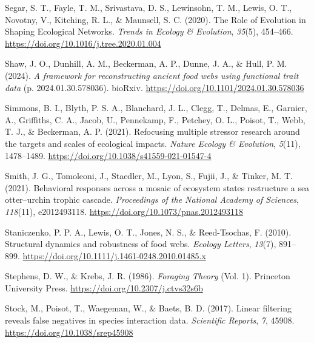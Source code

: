 \documentclass[
]{article}
\newlength{\cslhangindent}
\newenvironment{CSLReferences}[2] %
 {\begin{list}{}{%
  \setlength{\itemindent}{0pt}
  \setlength{\leftmargin}{0pt}
  \setlength{\parsep}{0pt}
  \ifodd #1
   \setlength{\leftmargin}{\cslhangindent}
   \setlength{\itemindent}{-1\cslhangindent}
  \fi
  \setlength{\itemsep}{#2\baselineskip}}}
 {\end{list}}
\begin{document}
\begin{CSLReferences}{1}{0}
Segar, S. T., Fayle, T. M., Srivastava, D. S., Lewinsohn, T. M., Lewis,
O. T., Novotny, V., Kitching, R. L., \& Maunsell, S. C. (2020). The
{Role} of {Evolution} in {Shaping Ecological Networks}. \emph{Trends in
Ecology \& Evolution}, \emph{35}(5), 454--466.
\url{https://doi.org/10.1016/j.tree.2020.01.004}

Shaw, J. O., Dunhill, A. M., Beckerman, A. P., Dunne, J. A., \& Hull, P.
M. (2024). \emph{A framework for reconstructing ancient food webs using
functional trait data} (p. 2024.01.30.578036). bioRxiv.
\url{https://doi.org/10.1101/2024.01.30.578036}

Simmons, B. I., Blyth, P. S. A., Blanchard, J. L., Clegg, T., Delmas,
E., Garnier, A., Griffiths, C. A., Jacob, U., Pennekamp, F., Petchey, O.
L., Poisot, T., Webb, T. J., \& Beckerman, A. P. (2021). Refocusing
multiple stressor research around the targets and scales of ecological
impacts. \emph{Nature Ecology \& Evolution}, \emph{5}(11), 1478--1489.
\url{https://doi.org/10.1038/s41559-021-01547-4}

Smith, J. G., Tomoleoni, J., Staedler, M., Lyon, S., Fujii, J., \&
Tinker, M. T. (2021). Behavioral responses across a mosaic of ecosystem
states restructure a sea otter--urchin trophic cascade.
\emph{Proceedings of the National Academy of Sciences}, \emph{118}(11),
e2012493118. \url{https://doi.org/10.1073/pnas.2012493118}

Staniczenko, P. P. A., Lewis, O. T., Jones, N. S., \& Reed-Tsochas, F.
(2010). Structural dynamics and robustness of food webs. \emph{Ecology
Letters}, \emph{13}(7), 891--899.
\url{https://doi.org/10.1111/j.1461-0248.2010.01485.x}

Stephens, D. W., \& Krebs, J. R. (1986). \emph{Foraging {Theory}} (Vol.
1). Princeton University Press.
\url{https://doi.org/10.2307/j.ctvs32s6b}

Stock, M., Poisot, T., Waegeman, W., \& Baets, B. D. (2017). Linear
filtering reveals false negatives in species interaction data.
\emph{Scientific Reports}, \emph{7}, 45908.
\url{https://doi.org/10.1038/srep45908}


\end{CSLReferences}
\end{document}
